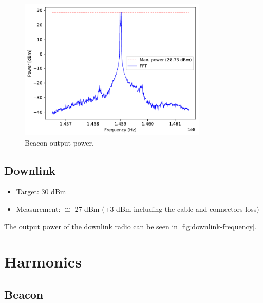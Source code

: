 \begin{figure}[H]
    \begin{center}
        \includegraphics[width=0.8\textwidth]{figures/tests/beacon_output_power.pdf}
        \caption{Beacon output power.}
        \label{fig:beacon-output-power}
    \end{center}
\end{figure}

\subsection{Downlink}

\begin{itemize}
    \item Target: 30 dBm
    \item Measurement: $\cong$ 27 dBm (+3 dBm including the cable and connectors loss)
\end{itemize}

The output power of the downlink radio can be seen in \autoref{fig:downlink-frequency}.

\section{Harmonics}

\subsection{Beacon}

